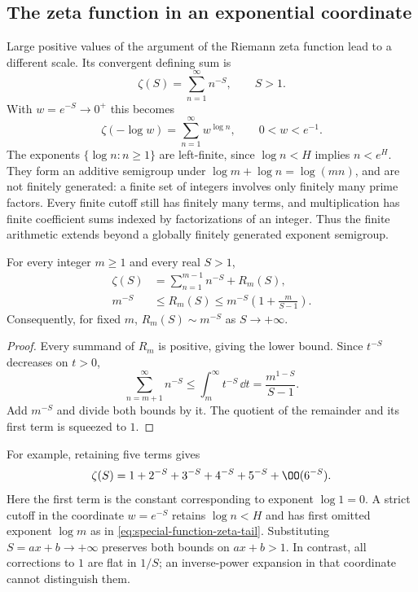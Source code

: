 \subsection{The zeta function in an exponential coordinate}

Large positive values of the argument of the Riemann zeta function
lead to a different scale. Its convergent defining sum is
\cite[(25.2.1)]{dlmf}
\[
 \zeta(S)=\sum_{n=1}^\infty n^{-S},\qquad S>1.
\]
With $w=e^{-S}\to0^+$ this becomes
\begin{equation}
 \zeta(-\log w)=\sum_{n=1}^\infty w^{\log n},
       \qquad 0<w<e^{-1}.
 \label{eq:special-function-zeta-coordinate}
\end{equation}
The exponents $\{\log n:n\ge1\}$ are left-finite, since
$\log n<H$ implies $n<e^H$. They form an additive semigroup under
$\log m+\log n=\log(mn)$, and are not finitely generated: a finite
set of integers involves only finitely many prime factors.
Every finite cutoff still has finitely many
terms, and multiplication has finite coefficient sums indexed by
factorizations of an integer. Thus the finite arithmetic extends
beyond a globally finitely generated exponent semigroup.

\begin{proposition}
\label{prop:special-function-zeta-tail}
For every integer $m\ge1$ and every real $S>1$,
\begin{equation}
\begin{aligned}
 \zeta(S)&=\sum_{n=1}^{m-1}n^{-S}+R_m(S),\\
 m^{-S}&\le R_m(S)
       \le m^{-S}\left(1+\frac{m}{S-1}\right).
\end{aligned}
\label{eq:special-function-zeta-tail}
\end{equation}
Consequently, for fixed $m$, $R_m(S)\sim m^{-S}$ as $S\to+\infty$.
\end{proposition}
\begin{proof}
Every summand of $R_m$ is positive, giving the lower bound. Since
$t^{-S}$ decreases on $t>0$,
\[
 \sum_{n=m+1}^\infty n^{-S}
       \le\int_m^\infty t^{-S}\,\dd t
       =\frac{m^{1-S}}{S-1}.
\]
Add $m^{-S}$ and divide both bounds by it. The quotient of the
remainder and its first term is squeezed to $1$.
\end{proof}

For example, retaining five terms gives
\begin{equation}
 \zeta(S)=1+2^{-S}+3^{-S}+4^{-S}+5^{-S}+\OO(6^{-S}).
 \label{eq:special-function-zeta-five-terms}
\end{equation}
Here the first term is the constant corresponding to exponent
$\log1=0$. A strict cutoff in the coordinate $w=e^{-S}$ retains
$\log n<H$ and has first omitted exponent $\log m$ as in
\eqref{eq:special-function-zeta-tail}. Substituting
$S=ax+b\to+\infty$ preserves both bounds on $ax+b>1$.
In contrast, all corrections to $1$ are flat in $1/S$; an
inverse-power expansion in that coordinate cannot distinguish them.

